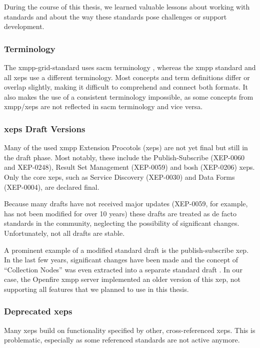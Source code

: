During the course of this thesis, we learned valuable lessons about working with standards and about the way these standards pose challenges or support development.

\subsubsection{Terminology}

The \gls{xmpp-grid-standard} uses \gls{sacm} terminology \cite{ietf-sacm-terminology-14}, whereas the \gls{xmpp} standard and all \glspl{xep} use a different terminology.
Most concepts and term definitions differ or overlap slightly, making it difficult to comprehend and connect both formats.
It also makes the use of a consistent terminology impossible, as some concepts from \gls{xmpp}/\glspl{xep} are not reflected in \gls{sacm} terminology and vice versa.

\subsubsection{\glspl{xep} Draft Versions}
Many of the used \gls{xmpp} Extension Procotols (\glspl{xep}) are not yet final but still in the draft phase.
Most notably, these include the Publish-Subscribe (XEP-0060 and XEP-0248), Result Set Management (XEP-0059) and \gls{bosh} (XEP-0206) \glspl{xep}.
Only the core \glspl{xep}, such as Service Discovery (XEP-0030) and Data Forms (XEP-0004), are declared final.

Because many drafts have not received major updates (XEP-0059, for example, has not been modified for over 10 years) these drafts are treated as de facto standards in the community, neglecting the possibility of significant changes.
Unfortunately, not all drafts are stable.

A prominent example of a modified standard draft is the \gls{publish-subscribe} \gls{xep}.
In the last few years, significant changes have been made and the concept of ``Collection Nodes'' was even extracted into a separate standard draft \cite{xep-0248}.
In our case, the Openfire \gls{xmpp} server implemented an older version of this \gls{xep}, not supporting all features that we planned to use in this thesis.

\subsubsection{Deprecated \glspl{xep}}

Many \glspl{xep} build on functionality specified by other, cross-referenced \glspl{xep}.
This is problematic, especially as some referenced standards are not active anymore.

